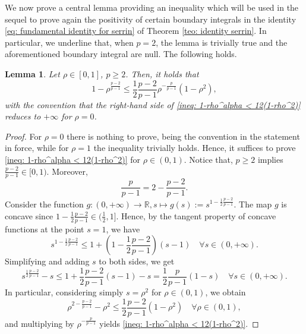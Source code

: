 \documentclass[10pt,a4paper, reqno]{amsart}
\numberwithin{equation}{section}
\newcommand{\R}{\mathbb{R}}
\newtheorem{lemma}[teo]{Lemma}
\begin{document}
    We now prove a central lemma providing an inequality which will be used in the sequel to prove again the positivity of certain boundary integrals in the identity \eqref{eq: fundamental identity for serrin} of Theorem \ref{teo: identity serrin}. In particular, we underline that, when $p=2$, the lemma is trivially true and the aforementioned boundary integral are null. The following holds.
    
    \begin{lemma}\label{lem:rho ineq}
        Let $\rho \in [0,1]$, $p \geq 2$. Then, it holds that
        \begin{equation}\label{ineq: 1-rho^alpha < 12(1-rho^2)}
            1-\rho^{\frac{p-2}{p-1}} \leq \frac{1}{2} \frac{p-2}{p-1} \rho^{-\frac{p}{p-1}} (1-\rho^2),
        \end{equation}
        with the convention that the right-hand side of \eqref{ineq: 1-rho^alpha < 12(1-rho^2)} reduces to  $+\infty$ for $\rho=0$.
    \end{lemma}

    \begin{proof}
        For $\rho=0$ there is nothing to prove, being the convention in the statement in force, while for $\rho=1$ the inequality trivially holds.
        Hence, it suffices to prove \eqref{ineq: 1-rho^alpha < 12(1-rho^2)} for $\rho \in (0,1)$. Notice that, $p\geq 2$ implies $\frac{p-2}{p-1} \in [0,1)$. Moreover,
        \begin{equation*}
            \frac{p}{p-1} = 2-\frac{p-2}{p-1}.
        \end{equation*}
        Consider the function $g: (0,+\infty) \longrightarrow \R, s \mapsto g(s) := s^{1- \frac{1}{2}\frac{p-2}{p-1}}$. The map $g$ is concave since $1- \frac{1}{2}\frac{p-2}{p-1} \in (\frac{1}{2},1]$. Hence, by the tangent property of concave functions at the point $s=1$, we have
        \begin{equation*}
            s^{1- \frac{1}{2}\frac{p-2}{p-1}} \leq 1 + \left(1- \frac{1}{2}\frac{p-2}{p-1} \right)(s-1) \quad \forall s \in (0,+\infty).
        \end{equation*}
        Simplifying and adding $s$ to both sides, we get
        \begin{equation*}
            s^{\frac{1}{2}\frac{p-2}{p-1}} - s \leq 1 + \frac{1}{2}\frac{p-2}{p-1}(s-1) - s = \frac{1}{2}\frac{p}{p-1}(1-s) \quad \forall s \in (0,+\infty).
        \end{equation*}
        In particular, considering simply $s = \rho^2$ for $\rho \in (0,1)$, we obtain
        \begin{equation*}
            \rho^{2 - \frac{p-2}{p-1}} - \rho^2 \leq \frac{1}{2}\frac{p-2}{p-1}(1-\rho^2) \quad \forall \rho \in (0,1),
        \end{equation*}
        and multiplying by $\rho^{-\frac{p}{p-1}}$ yields \eqref{ineq: 1-rho^alpha < 12(1-rho^2)}.
    \end{proof}
\end{document}
